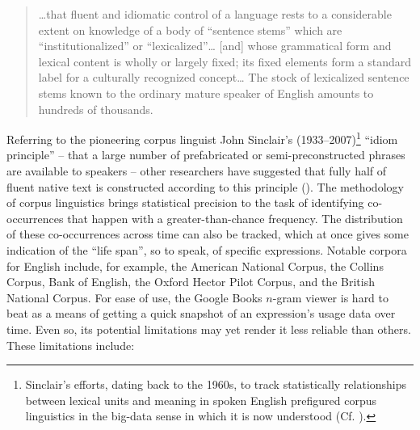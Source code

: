 \documentclass[english,output=paper,colorlinks,citecolor=brown]{../langscibook}
\begin{document}
\begin{quote}
…that fluent and idiomatic control of a language rests to a considerable extent on knowledge of a body of ``sentence stems'' which are ``institutionalized'' or ``lexicalized''… [and] whose grammatical form and lexical content is wholly or largely fixed; its fixed elements form a standard label for a culturally recognized concept… The stock of lexicalized sentence stems known to the ordinary mature speaker of English amounts to hundreds of thousands.  
\end{quote}

Referring to the pioneering corpus linguist John Sinclair’s (1933--2007)\footnote{Sinclair’s efforts, dating back to the 1960s, to track statistically relationships between lexical units and meaning in spoken English prefigured corpus linguistics in the big-data sense in which it is now understood (Cf. \citealt{Chapelle2013}).} ``idiom principle'' – that a large number of prefabricated or semi-preconstructed phrases are available to speakers – other researchers have suggested that fully half of fluent native text is constructed according to this principle (\citealt[29]{ErmanWarren2000}). The methodology of corpus linguistics brings statistical precision to the task of identifying co-occurrences that happen with a greater-than-chance frequency.  The distribution of these co-occurrences across time can also be tracked, which at once gives some indication of the ``life span'', so to speak, of specific expressions. Notable corpora for English include, for example, the American National Corpus, the Collins Corpus, Bank of English, the Oxford Hector Pilot Corpus, and the British National Corpus. For ease of use, the Google Books $n$-gram viewer is hard to beat as a means of getting a quick snapshot of an expression’s usage data over time.  Even so, its potential limitations may yet render it less reliable than others. These limitations include: 
\end{document}
